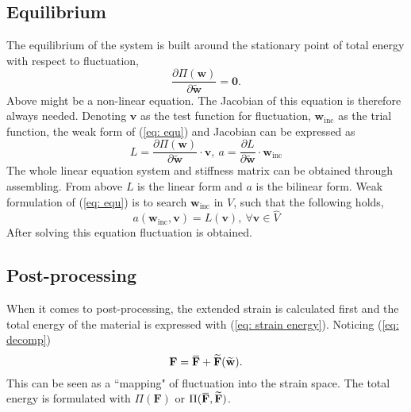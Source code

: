 \documentclass[10pt,a4paper]{scrreprt}
\newcommand{\overbar}[1]{\mkern 1.5mu\overline{\mkern-1.5mu#1\mkern-1.5mu}\mkern 1.5mu}
\begin{document}
\subsection{Equilibrium}
The equilibrium of the system is built around the stationary point of total energy with respect to fluctuation,
\begin{equation}
\label{eq: equ}
\dfrac{\partial \Pi(\mathbf{w})}{\partial \widetilde{\mathbf{w}}} = \mathbf{0}.
\end{equation}
Above might be a non-linear equation. The Jacobian of this equation is therefore always needed. Denoting $\mathbf{v}$ as the test function for fluctuation, $\mathbf{w}_{\text{inc}}$ as the trial function, the weak form of (\ref{eq: equ}) and Jacobian can be expressed as
\begin{equation}
\label{eq: bi and li}
L = \dfrac{\partial \Pi(\mathbf{w})}{\partial \widetilde{\mathbf{w}}} \cdot \mathbf{v}, \ a = \dfrac{\partial L}{\partial \widetilde{\mathbf{w}}} \cdot \mathbf{w}_{\text{inc}}
\end{equation}
The whole linear equation system and stiffness matrix can be obtained through assembling. From above $L$ is the linear form and $a$ is the bilinear form. Weak formulation of (\ref{eq: equ}) is to search $\mathbf{w}_{\text{inc}}$ in $V$, such that the following holds,
\begin{equation}
a(\mathbf{w}_{\text{inc}}, \mathbf{v}) = L(\mathbf{v}),\ \forall \mathbf{v} \in \hat{V}
\end{equation}
After solving this equation fluctuation is obtained.

\subsection{Post-processing}
When it comes to post-processing, the extended strain is calculated first and the total energy of the material is expressed with (\ref{eq: strain energy}). Noticing (\ref{eq: decomp})
\begin{equation}
\mathbf{F} = \overbar{\mathbf{F}} + \widetilde{\mathbf{F}}(\widetilde{\mathbf{w}}).
\end{equation}
This can be seen as a ``mapping" of fluctuation into the strain space. The total energy is formulated with $\Pi(\mathbf{F})$ or $\Pi(\overbar{\mathbf{F}},\widetilde{\mathbf{F}})$.
\end{document}
